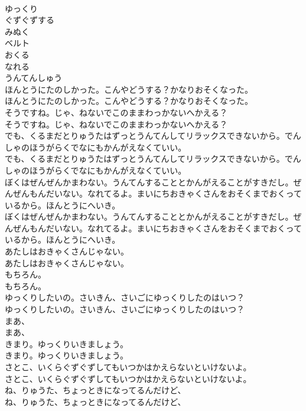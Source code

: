 \documentclass[8pt]{extreport}
\begin{document}
\begin{CJK}{UTF8}{min}
\\	ゆっくり
\\	ぐずぐずする
\\	みぬく
\\	ベルト
\\	おくる
\\	なれる
\\	うんてんしゅう
\\	ほんとうにたのしかった。こんやどうする？かなりおそくなった。	
\\	ほんとうにたのしかった。こんやどうする？かなりおそくなった。 
\\	そうですね。じゃ、ねないでこのままわっかないへかえる？	
\\	そうですね。じゃ、ねないでこのままわっかないへかえる？ 
\\	でも、くるまだとりゅうたはずっとうんてんしてリラックスできないから。でんしゃのほうがらくでなにもかんがえなくていい。	
\\	でも、くるまだとりゅうたはずっとうんてんしてリラックスできないから。でんしゃのほうがらくでなにもかんがえなくていい。 
\\	ぼくはぜんぜんかまわない。うんてんすることとかんがえることがすきだし。ぜんぜんもんだいない。なれてるよ。まいにちおきゃくさんをおそくまでおくっているから。ほんとうにへいき。	
\\	ぼくはぜんぜんかまわない。うんてんすることとかんがえることがすきだし。ぜんぜんもんだいない。なれてるよ。まいにちおきゃくさんをおそくまでおくっているから。ほんとうにへいき。 
\\	あたしはおきゃくさんじゃない。	
\\	あたしはおきゃくさんじゃない。 
\\	もちろん。	
\\	もちろん。 
\\	ゆっくりしたいの。さいきん、さいごにゆっくりしたのはいつ？	
\\	ゆっくりしたいの。さいきん、さいごにゆっくりしたのはいつ？ 
\\	まあ、	
\\	まあ、 
\\	きまり。ゆっくりいきましょう。	
\\	きまり。ゆっくりいきましょう。 
\\	さとこ、いくらぐずぐずしてもいつかはかえらないといけないよ。	
\\	さとこ、いくらぐずぐずしてもいつかはかえらないといけないよ。 
\\	ね、りゅうた、ちょっときになってるんだけど、	
\\	ね、りゅうた、ちょっときになってるんだけど、 

\end{CJK}
\end{document}
